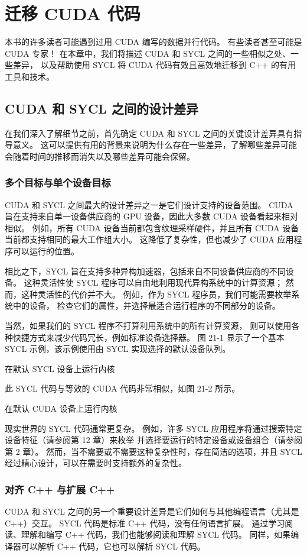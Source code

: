 \section{迁移 CUDA 代码}
本书的许多读者可能遇到过用 CUDA 编写的数据并行代码。 
有些读者甚至可能是 CUDA 专家！ 在本章中，我们将描述 CUDA 和 SYCL 之间的一些相似之处、一些差异，
以及帮助使用 SYCL 将 CUDA 代码有效且高效地迁移到 C++ 的有用工具和技术。

\subsection{CUDA 和 SYCL 之间的设计差异}
在我们深入了解细节之前，首先确定 CUDA 和 SYCL 之间的关键设计差异具有指导意义。 
这可以提供有用的背景来说明为什么存在一些差异，了解哪些差异可能会随着时间的推移而消失以及哪些差异可能会保留。

\subsubsection{多个目标与单个设备目标}
CUDA 和 SYCL 之间最大的设计差异之一是它们设计支持的设备范围。 
CUDA 旨在支持来自单一设备供应商的 GPU 设备，因此大多数 CUDA 设备看起来相对相似。 
例如，所有 CUDA 设备当前都包含纹理采样硬件，并且所有 CUDA 设备当前都支持相同的最大工作组大小。 
这降低了复杂性，但也减少了 CUDA 应用程序可以运行的位置。

相比之下，SYCL 旨在支持多种异构加速器，包括来自不同设备供应商的不同设备。 
这种灵活性使 SYCL 程序可以自由地利用现代异构系统中的计算资源； 
然而，这种灵活性的代价并不大。 例如，作为 SYCL 程序员，我们可能需要枚举系统中的设备，
检查它们的属性，并选择最适合运行程序的不同部分的设备。

当然，如果我们的 SYCL 程序不打算利用系统中的所有计算资源，
则可以使用各种快捷方式来减少代码冗长，例如标准设备选择器。 
图 21-1 显示了一个基本 SYCL 示例，该示例使用由 SYCL 实现选择的默认设备队列。

{\color{red} 在默认 SYCL 设备上运行内核}

此 SYCL 代码与等效的 CUDA 代码非常相似，如图 21-2 所示。

{\color{red} 在默认 CUDA 设备上运行内核}

现实世界的 SYCL 代码通常更复杂。 
例如，许多 SYCL 应用程序将通过搜索特定设备特征（请参阅第 12 章）来枚举
并选择要运行的特定设备或设备组合（请参阅第 2 章）。 
然而，当不需要或不需要这种复杂性时，存在简洁的选项，并且 SYCL 经过精心设计，可以在需要时支持额外的复杂性。

\subsubsection{对齐 C++ 与扩展 C++}
CUDA 和 SYCL 之间的另一个重要设计差异是它们如何与其他编程语言（尤其是 C++）交互。 
SYCL 代码是标准 C++ 代码，没有任何语言扩展。 
通过学习阅读、理解和编写 C++ 代码，我们也能够阅读和理解 SYCL 代码。 
同样，如果编译器可以解析 C++ 代码，它也可以解析 SYCL 代码。

